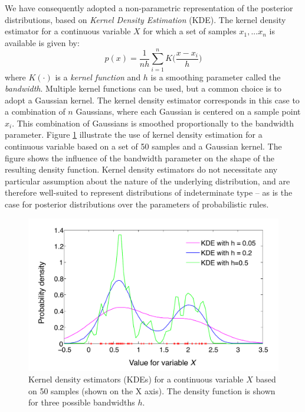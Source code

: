 We have consequently adopted a non-parametric representation of the posterior distributions, based on \textit{Kernel Density Estimation} (KDE).  The kernel density estimator for a continuous variable $X$ for which a set of samples $x_1, ... x_n$ is available is given by:
\begin{equation}
p(x) = \frac{1}{nh} \sum_{i=1}^n K\Big(\frac{x-x_i}{h}\Big) \label{eq:kde}
\end{equation}
where $K(\cdot)$ is a \textit{kernel function} and $h$ is a smoothing parameter called the \textit{bandwidth}. Multiple kernel functions can be used, but a common choice is to adopt a Gaussian kernel. The kernel density estimator corresponds in this case to a combination of $n$ Gaussians, where each Gaussian is centered on a sample point $x_i$.  This combination of Gaussians is smoothed proportionally to the bandwidth parameter. Figure \ref{fig:kde} illustrate the use of kernel density estimation for a continuous variable based on a set of 50 samples and a Gaussian kernel. The figure shows the influence of the bandwidth parameter on the shape of the resulting density function. Kernel density estimators do not necessitate any particular assumption about the nature of the underlying distribution, and are therefore well-suited to represent distributions of indeterminate type -- as is the case for posterior distributions over the parameters of probabilistic rules. 

\begin{figure}[h]
\centering
\includegraphics[scale=0.45]{imgs/kde.pdf} 
\caption{Kernel density estimators (KDEs) for a continuous variable $X$ based on 50 samples (shown on the X axis). The density function is shown for three possible bandwidths $h$. }
\label{fig:kde}
\end{figure}

